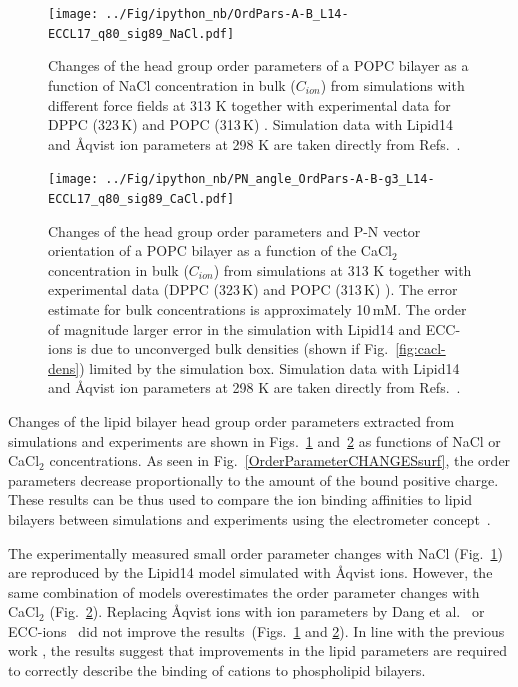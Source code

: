 \documentclass[journal=jpcbfk,manuscript=article]{achemso}
\begin{document}
\begin{figure}[htb!]
  \centering
  \texttt{[image: ../Fig/ipython\_nb/OrdPars-A-B\_L14-ECCL17\_q80\_sig89\_NaCl.pdf]}
  \caption{\label{fig:delta_ordPar_NaCl}
    Changes of the head group order parameters of a POPC bilayer as a function of NaCl concentration
    in bulk ($C_{ion}$) from simulations with different force fields at 313 K together with 
    experimental data for DPPC (323\,K) \cite{akutsu81} and POPC (313\,K) \cite{altenbach84}.
    Simulation data with Lipid14 and \AA{}qvist ion parameters at 298 K are taken directly from
    Refs.~\cite{lipid14POPC0mMNaClfiles,lipid14POPC1000mMNaClfiles}.
  }
\end{figure}

\begin{figure}[htb!]
  \centering
  \texttt{[image: ../Fig/ipython\_nb/PN\_angle\_OrdPars-A-B-g3\_L14-ECCL17\_q80\_sig89\_CaCl.pdf]}
  \caption{\label{fig:delta_ordPar_CaCl}
    Changes of the head group order parameters and P-N vector orientation of a POPC bilayer 
    as a function of the CaCl$_2$ concentration in bulk ($C_{ion}$)
    from simulations at 313 K together with experimental data 
    (DPPC (323\,K) \cite{akutsu81} and POPC (313\,K) \cite{altenbach84}). 
    The error estimate for bulk concentrations is approximately 10\,mM.
    The order of magnitude larger error in the
    simulation with Lipid14 and ECC-ions is due to unconverged bulk densities  (shown if Fig.~\ref{fig:cacl-dens}) limited by
    the simulation box. 
    Simulation data with Lipid14 and \AA{}qvist ion parameters at 298 K are taken directly from
    Refs.~.
  }
\end{figure}

Changes of the lipid bilayer head group order parameters extracted from simulations and
experiments \cite{akutsu81, altenbach84} are shown in Figs.~\ref{fig:delta_ordPar_NaCl}
and~\ref{fig:delta_ordPar_CaCl} as functions of NaCl or CaCl$_2$ concentrations.
As seen in Fig.~\ref{OrderParameterCHANGESsurf}, the order parameters decrease
proportionally to the amount of the bound positive charge.
These results can be thus used to compare the ion binding affinities to lipid bilayers between
simulations and experiments using the electrometer concept~\cite{seelig87, catte16}.

The experimentally measured small order parameter
changes with NaCl (Fig.~\ref{fig:delta_ordPar_NaCl}) 
are reproduced by the Lipid14 model simulated with \AA{}qvist ions.
However, the same combination of models overestimates the order parameter changes with CaCl$_2$ (Fig.~\ref{fig:delta_ordPar_CaCl}).
Replacing \AA{}qvist ions with ion parameters by Dang et al.~\cite{smith94, chang1999, dang2006}
or ECC-ions~\cite{martinek17, kohagen16, Pluharova2014} did not improve
the results~(Figs.~\ref{fig:delta_ordPar_NaCl} and \ref{fig:delta_ordPar_CaCl}).
In line with the previous work \cite{catte16}, the results suggest that improvements
in the lipid parameters are required to correctly describe the binding of cations to phospholipid bilayers.
\end{document}
